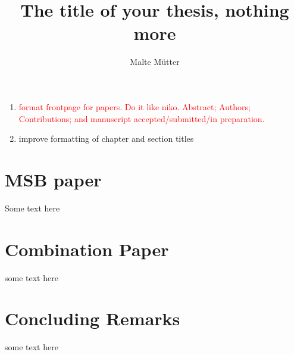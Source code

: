 \documentclass{thesis}
\title{The title of your thesis, nothing more}
\author{Malte Mütter}
\date{} %
\begin{document}
\frontmatter


\begin{summaryspacing}
  \tableofcontents*
\end{summaryspacing}

\pagebreak
\begin{enumerate}
  \item \textcolor{red}{format frontpage for papers. Do it like niko. Abstract; Authors; Contributions; and manuscript accepted/submitted/in preparation.}
  \item improve formatting of chapter and section titles
\end{enumerate}


\mainmatter
{}


\chapter{MSB paper}
Some text here

\chapter{Combination Paper}
some text here

\chapter{Concluding Remarks}
some text here
\end{document}
